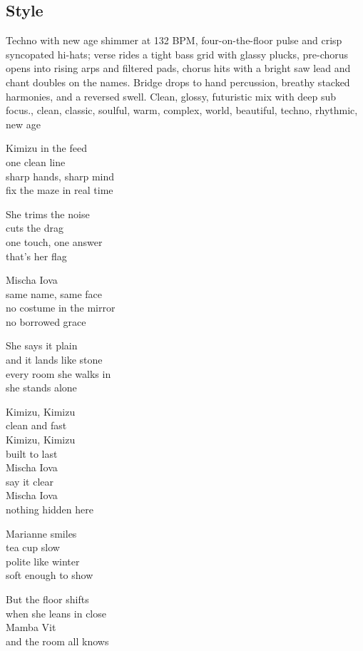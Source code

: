 \subsection{Style}
Techno with new age shimmer at 132 BPM, four-on-the-floor pulse and crisp syncopated hi-hats; verse rides a tight bass grid with glassy plucks, pre-chorus opens into rising arps and filtered pads, chorus hits with a bright saw lead and chant doubles on the names. Bridge drops to hand percussion, breathy stacked harmonies, and a reversed swell. Clean, glossy, futuristic mix with deep sub focus., clean, classic, soulful, warm, complex, world, beautiful, techno, rhythmic, new age

\begin{lyrics}

Kimizu in the feed\\
one clean line\\
sharp hands, sharp mind\\
fix the maze in real time

She trims the noise\\
cuts the drag\\
one touch, one answer\\
that’s her flag

Mischa Iova\\
same name, same face\\
no costume in the mirror\\
no borrowed grace

She says it plain\\
and it lands like stone\\
every room she walks in\\
she stands alone

Kimizu, Kimizu\\
clean and fast\\
Kimizu, Kimizu\\
built to last\\
Mischa Iova\\
say it clear\\
Mischa Iova\\
nothing hidden here

Marianne smiles\\
tea cup slow\\
polite like winter\\
soft enough to show

But the floor shifts\\
when she leans in close\\
Mamba Vit\\
and the room all knows


\end{lyrics}
